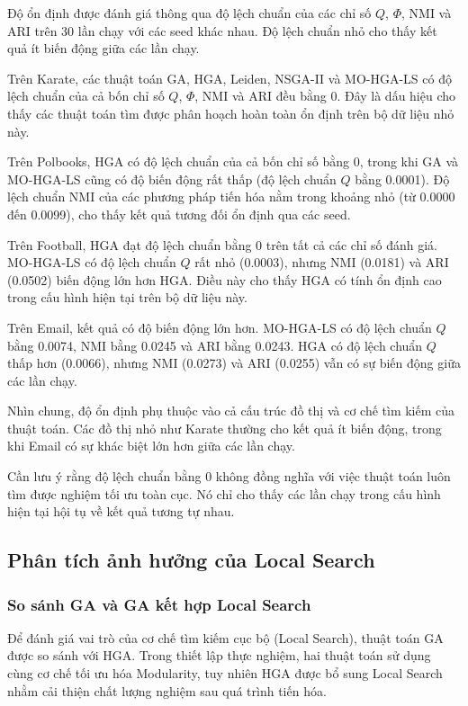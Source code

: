 \documentclass[14pt,a4paper]{extarticle}
\begin{document}
Độ ổn định được đánh giá thông qua độ lệch chuẩn của các chỉ số $Q$, $\Phi$, NMI và ARI trên 30 lần chạy với các seed khác nhau. Độ lệch chuẩn nhỏ cho thấy kết quả ít biến động giữa các lần chạy.

Trên Karate, các thuật toán GA, HGA, Leiden, NSGA-II và MO-HGA-LS có độ lệch chuẩn của cả bốn chỉ số $Q$, $\Phi$, NMI và ARI đều bằng 0. Đây là dấu hiệu cho thấy các thuật toán tìm được phân hoạch hoàn toàn ổn định trên bộ dữ liệu nhỏ này.

Trên Polbooks, HGA có độ lệch chuẩn của cả bốn chỉ số bằng 0, trong khi GA và MO-HGA-LS cũng có độ biến động rất thấp (độ lệch chuẩn $Q$ bằng 0.0001). Độ lệch chuẩn NMI của các phương pháp tiến hóa nằm trong khoảng nhỏ (từ 0.0000 đến 0.0099), cho thấy kết quả tương đối ổn định qua các seed.

Trên Football, HGA đạt độ lệch chuẩn bằng 0 trên tất cả các chỉ số đánh giá. MO-HGA-LS có độ lệch chuẩn $Q$ rất nhỏ (0.0003), nhưng NMI (0.0181) và ARI (0.0502) biến động lớn hơn HGA. Điều này cho thấy HGA có tính ổn định cao trong cấu hình hiện tại trên bộ dữ liệu này.

Trên Email, kết quả có độ biến động lớn hơn. MO-HGA-LS có độ lệch chuẩn $Q$ bằng 0.0074, NMI bằng 0.0245 và ARI bằng 0.0243. HGA có độ lệch chuẩn $Q$ thấp hơn (0.0066), nhưng NMI (0.0273) và ARI (0.0255) vẫn có sự biến động giữa các lần chạy.

Nhìn chung, độ ổn định phụ thuộc vào cả cấu trúc đồ thị và cơ chế tìm kiếm của thuật toán. Các đồ thị nhỏ như Karate thường cho kết quả ít biến động, trong khi Email có sự khác biệt lớn hơn giữa các lần chạy.

Cần lưu ý rằng độ lệch chuẩn bằng 0 không đồng nghĩa với việc thuật toán luôn tìm được nghiệm tối ưu toàn cục. Nó chỉ cho thấy các lần chạy trong cấu hình hiện tại hội tụ về kết quả tương tự nhau.

\subsection{Phân tích ảnh hưởng của Local Search}
\subsubsection{So sánh GA và GA kết hợp Local Search}

Để đánh giá vai trò của cơ chế tìm kiếm cục bộ (Local Search), thuật toán GA được so sánh với HGA. Trong thiết lập thực nghiệm, hai thuật toán sử dụng cùng cơ chế tối ưu hóa Modularity, tuy nhiên HGA được bổ sung Local Search nhằm cải thiện chất lượng nghiệm sau quá trình tiến hóa.
\end{document}
